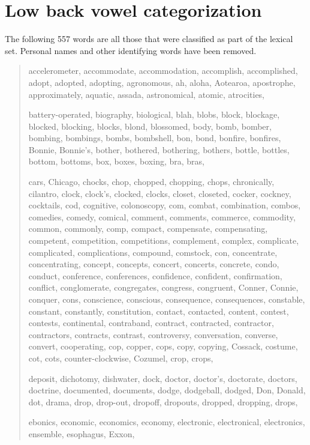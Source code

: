 \chapter{Low back vowel categorization}
\label{appendix:lowback_categories}


The following 557 words are all those that were classified as part of the \lot lexical set. Personal names and other identifying words have been removed.

\begin{quote}
    accelerometer, accommodate, accommodation, accomplish, accomplished, adopt, adopted, adopting, agronomous, ah, aloha, Aotearoa, apostrophe, approximately, aquatic, assada, astronomical, atomic, atrocities, 
    
    battery-operated, biography, biological, blah, blobs, block, blockage, blocked, blocking, blocks, blond, blossomed, body, bomb, bomber, bombing, bombings, bombs, bombshell, bon, bond, bonfire, bonfires, Bonnie, Bonnie's, bother, bothered, bothering, bothers, bottle, bottles, bottom, bottoms, box, boxes, boxing, bra, bras,  
    
    cars, Chicago, chocks, chop, chopped, chopping, chops, chronically, cilantro, clock, clock's, clocked, clocks, closet, closeted, cocker, cockney, cocktails, cod, cognitive, colonoscopy, com, combat, combination, combos, comedies, comedy, comical, comment, comments, commerce, commodity, common, commonly, comp, compact, compensate, compensating, competent, competition, competitions, complement, complex, complicate, complicated, complications, compound, comstock, con, concentrate, concentrating, concept, concepts, concert, concerts, concrete, condo, conduct, conference, conferences, confidence, confident, confirmation, conflict, conglomerate, congregates, congress, congruent, Conner, Connie, conquer, cons, conscience, conscious, consequence, consequences, constable, constant, constantly, constitution, contact, contacted, content, contest, contests, continental, contraband, contract, contracted, contractor, contractors, contracts, contrast, controversy, conversation, converse, convert, cooperating, cop, copper, cops, copy, copying, Cossack, costume, cot, cots, counter-clockwise, Cozumel, crop, crops, 
    
    deposit, dichotomy, dishwater, dock, doctor, doctor's, doctorate, doctors, doctrine, documented, documents, dodge, dodgeball, dodged, Don, Donald, dot, drama, drop, drop-out, dropoff, dropouts, dropped, dropping, drops, 
    
    ebonics, economic, economics, economy, electronic, electronical, electronics, ensemble, esophagus, Exxon, 
    

\end{quote}
